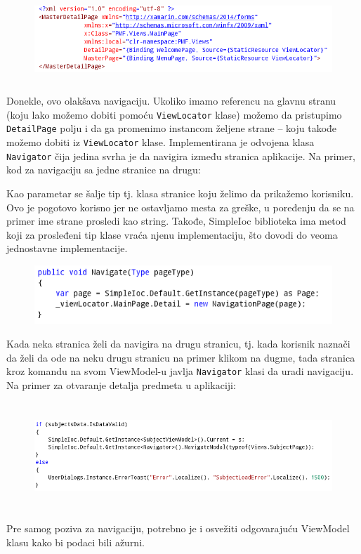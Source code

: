 \documentclass[a4paper]{article}
\begin{document}
\begin{figure}
\centering
\includegraphics[width=140.72mm,height=31.63mm]{msc-img47.png}
\end{figure}
Donekle, ovo olakšava navigaciju. Ukoliko imamo referencu na glavnu
stranu (koju lako možemo dobiti pomoću
\texttt{\textcolor[rgb]{0.0,0.4,0.8}{ViewLocator}} klase) možemo da
pristupimo \texttt{\textcolor[rgb]{0.0,0.4,0.8}{DetailPage}} polju i da
ga promenimo instancom željene strane – koju takođe možemo dobiti iz
\texttt{\textcolor[rgb]{0.0,0.4,0.8}{ViewLocator}} klase.
Implementirana je odvojena klasa
\texttt{\textcolor[rgb]{0.0,0.4,0.8}{Navigator}} čija jedina svrha je
da navigira između stranica aplikacije. Na primer, kod za navigaciju sa
jedne stranice na drugu:

Kao parametar se šalje tip tj. klasa stranice koju želimo da prikažemo
korisniku. Ovo je pogotovo korisno jer ne ostavljamo mesta za greške, u
poređenju da se na primer ime strane prosledi kao string. Takođe,
SimpleIoc biblioteka ima metod koji za prosleđeni tip klase vraća njenu
implementaciju, što dovodi do veoma jednostavne implementacije.

\begin{figure}
\centering
\includegraphics[width=112.18mm,height=22.1mm]{msc-img48.png}
\end{figure}
Kada neka stranica želi da navigira na drugu stranicu, tj. kada korisnik
naznači da želi da ode na neku drugu stranicu na primer klikom na
dugme, tada stranica kroz komandu na svom ViewModel-u javlja
\texttt{\textcolor[rgb]{0.0,0.4,0.8}{Navigator}} klasi da uradi
navigaciju. Na primer za otvaranje detalja predmeta u aplikaciji:



\begin{figure}
\centering
\includegraphics[width=170mm,height=40.23mm]{msc-img49.png}
\end{figure}
Pre samog poziva za navigaciju, potrebno je i osvežiti odgovarajuću
ViewModel klasu kako bi podaci bili ažurni.
\end{document}
